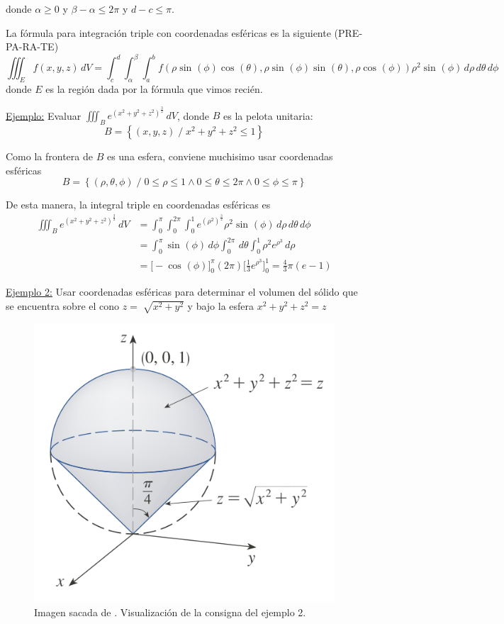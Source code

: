 \documentclass[12pt]{article}
\begin{document}
donde $ \alpha\geq 0 $ y $ \beta-\alpha\leq 2\pi $ y $ d-c\leq \pi $.

La fórmula para integración triple con coordenadas esféricas es la siguiente (PRE-PA-RA-TE)
\[
  \iiint_{E} f(x,y,z) \,dV = \int_{c}^{d} \int_{\alpha}^{\beta} \int_{a}^{b} f(\rho\sin^{}(\phi)\cos^{}(\theta),\rho\sin^{}(\phi)\sin^{}(\theta),\rho\cos^{}(\phi))\rho^2\sin^{}(\phi) \,d\rho\,d\theta\,d\phi
\]
donde $ E $ es la región dada por la fórmula que vimos recién.

\underline{Ejemplo:} Evaluar $ \iiint_{B} e^{\left(x^2+y^2+z^2\right)^\frac{3}{2}} \,dV $, donde $ B $ es la pelota unitaria:
\[
  B=\left\{(x,y,z) \;/\; x^2+y^2+z^2\leq 1\right\}
\]

Como la frontera de $ B $ es una esfera, conviene muchisimo usar coordenadas esféricas
\[
  B=\left\{(\rho,\theta,\phi) \;/\; 0\leq \rho\leq 1 \land 0\leq \theta\leq 2\pi \land 0\leq \phi\leq \pi\right\}
\]

De esta manera, la integral triple en coordenadas esféricas es 
\begin{align*}
  \iiint_{B} e^{\left(x^2+y^2+z^2\right)^\frac{3}{2}} \,dV &= \int_{0}^{\pi} \int_{0}^{2\pi} \int_{0}^{1} e^{(\rho^2)^\frac{3}{2}}\rho^2\sin^{}(\phi) \,d\rho\,d\theta\,d\phi\\
   &= \int_{0}^{\pi} \sin^{}(\phi) \,d\phi\int_{0}^{2\pi}  \,d\theta\int_{0}^{1} \rho^2e^{\rho^3} \,d\rho\\
   &= \Bigg[-\cos^{}(\phi)\Bigg]_{0}^{\pi}(2\pi)\Bigg[\frac{1}{3}e^{\rho^3}\Bigg]_{0}^{1}=\frac{4}{3}\pi(e-1) 
\end{align*}

\underline{Ejemplo 2:} Usar coordenadas esféricas para determinar el volumen del sólido que se encuentra sobre el cono $ z=\sqrt[]{x^2+y^2} $ y bajo la esfera $ x^2+y^2+z^2=z $

\begin{figure}[H]
  \centering
  \includegraphics[width=0.5\linewidth]{imagenes/coord-esfericas-ej2.png}
  \caption{Imagen sacada de \parencite{stewart2}. Visualización de la consigna del ejemplo 2.}
  \label{fig:coord-esf-ej2}
\end{figure}
\end{document}
